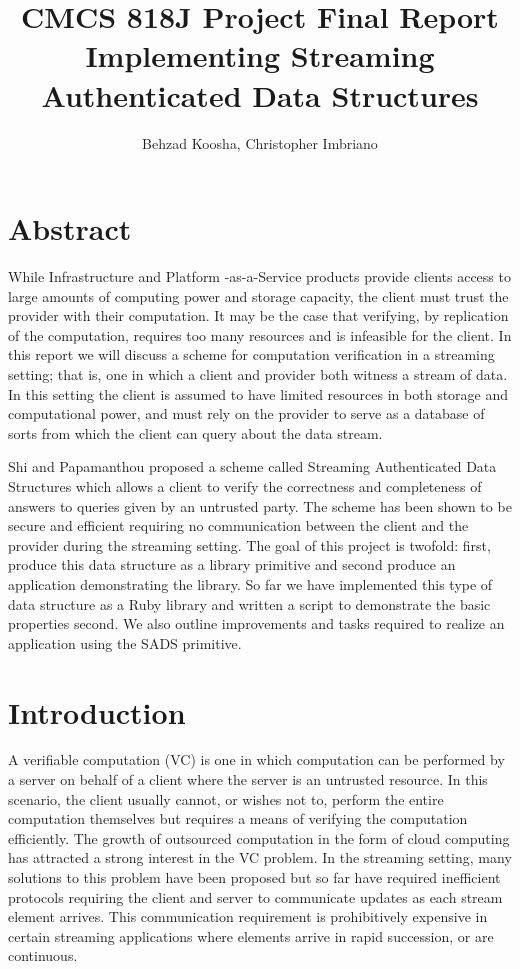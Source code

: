 \documentclass[11pt, letterpaper, oneside]{article}
\begin{document}
\title{\textbf{CMCS 818J Project Final Report} \\ Implementing Streaming Authenticated Data Structures}
\author{Behzad Koosha, Christopher Imbriano}

\maketitle

\section{Abstract}

	While Infrastructure and Platform -as-a-Service products provide clients access to large amounts of computing power and storage capacity, the client must trust the provider with their computation.
	It may be the case that verifying, by replication of the computation, requires too many resources and is infeasible for the client.
	In this report we will discuss a scheme for computation verification in a streaming setting; that is, one in which a client and provider both witness a stream of data.
	In this setting the client is assumed to have limited resources in both storage and computational power, and must rely on the provider to serve as a database of sorts from which the client can query about the data stream.

	Shi and Papamanthou \cite{sads} proposed a scheme called Streaming Authenticated Data Structures which allows a client to verify the correctness and completeness of answers to queries given by an untrusted party.
	The scheme has been shown to be secure and efficient requiring no communication between the client and the provider during the streaming setting.
	The goal of this project is twofold: first, produce this data structure as a library primitive and second produce an application demonstrating the library.
	So far we have implemented this type of data structure as a Ruby library and written a script to demonstrate the basic properties second.
	We also outline improvements and tasks required to realize an application using the SADS primitive.


\section{Introduction}

	A verifiable computation (VC) is one in which computation can be performed by a server on behalf of a client where the server is an untrusted resource.
	In this scenario, the client usually cannot, or wishes not to, perform the entire computation themselves but requires a means of verifying the computation efficiently.
	The growth of outsourced computation in the form of cloud computing has attracted a strong interest in the VC problem.
	In the streaming setting, many solutions to this problem have been proposed but so far have required inefficient protocols requiring the client and server to communicate updates as each stream element arrives.
	This communication requirement is prohibitively expensive in certain streaming applications where elements arrive in rapid succession, or are continuous.
\end{document}
